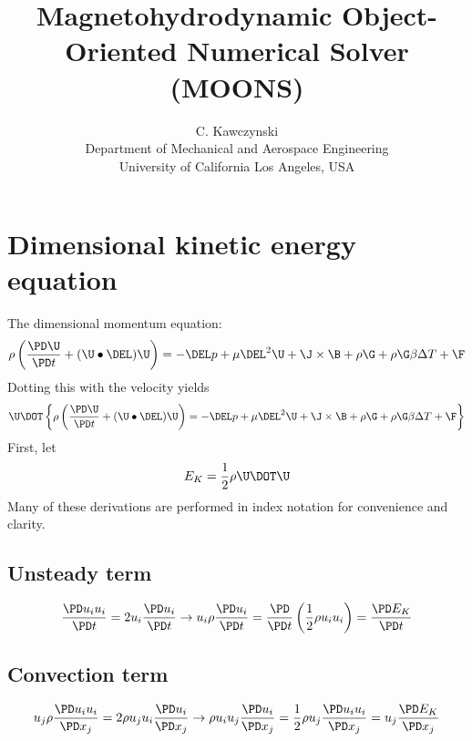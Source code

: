 \documentclass[11pt]{article}
\begin{document}
\doublespacing
\title{Magnetohydrodynamic Object-Oriented Numerical Solver (MOONS)}
\author{C. Kawczynski \\
Department of Mechanical and Aerospace Engineering \\
University of California Los Angeles, USA\\
}
\maketitle

\section{Dimensional kinetic energy equation}
The dimensional momentum equation:
\begin{equation}
	\rho \left( \frac{\PD \U}{\PD t} + (\U \bullet \DEL) \U \right) = 
	-\DEL p + \mu \DEL^2 \U + \J \times \B + \rho \G + \rho \G \beta \Delta T + \F
\end{equation}
Dotting this with the velocity yields
\begin{equation}
	\U \DOT \left\{ \rho \left( \frac{\PD \U}{\PD t} + (\U \bullet \DEL) \U \right) = 
	-\DEL p + \mu \DEL^2 \U + \J \times \B + \rho \G + \rho \G \beta \Delta T + \F \right\}
\end{equation}
First, let
\begin{equation}
	E_K = \frac{1}{2} \rho \U \DOT \U
\end{equation}
Many of these derivations are performed in index notation for convenience and clarity.
\subsection{Unsteady term}
\begin{equation}
	\frac{\PD u_i u_i}{\PD t} =
	2 u_i \frac{\PD u_i}{\PD t}
	\rightarrow
	u_i \rho \frac{\PD u_i}{\PD t} =
	\frac{\PD}{\PD t} \left( \frac{1}{2} \rho u_i u_i \right) =
	\frac{\PD E_K}{\PD t}
\end{equation}

\subsection{Convection term}
\begin{equation}
	u_j \rho \frac{\PD u_i u_i}{\PD x_j} =
	2 \rho u_j u_i \frac{\PD u_i}{\PD x_j}
	\rightarrow
	\rho u_i u_j \frac{\PD u_i}{\PD x_j} =
	\frac{1}{2} \rho u_j \frac{\PD u_i u_i}{\PD x_j}
	= u_j \frac{\PD E_K}{\PD x_j}
\end{equation}
\end{document}
